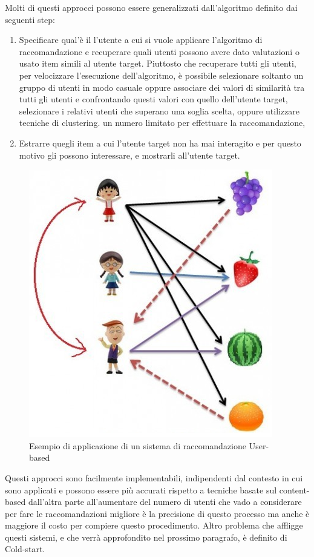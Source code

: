 Molti di questi approcci possono essere generalizzati dall'algoritmo definito dai seguenti step:
\begin{enumerate}
	\item Specificare qual'è il l'utente a cui si vuole applicare l'algoritmo di raccomandazione e recuperare quali utenti possono 
	avere dato valutazioni o usato item simili al utente target. Piuttosto che recuperare tutti gli utenti, per velocizzare l'esecuzione
	dell'algoritmo, è possibile selezionare soltanto un gruppo di utenti in modo casuale oppure associare dei valori di similarità tra 
	tutti gli utenti e confrontando questi valori con quello dell'utente target, selezionare i relativi utenti che superano una soglia
	scelta, oppure utilizzare tecniche di clustering. 
	un numero limitato per effettuare la raccomandazione, 
	\item Estrarre quegli item a cui l'utente target non ha mai interagito e per questo motivo gli possono interessare, e mostrarli 
	all'utente target.
\end{enumerate}

\begin{figure}[ht!]
	\centering
	\includegraphics[scale=0.5]{images/UB_CF_ex.PNG}
	\caption{Esempio di applicazione di un sistema di raccomandazione User-based}
	\label{fig:UB_CF}
\end{figure}

Questi approcci sono facilmente implementabili, indipendenti dal contesto in cui sono applicati e possono essere più accurati rispetto
a tecniche basate sul content-based dall'altra parte all'aumentare del numero di utenti che vado a considerare per fare le 
raccomandazioni migliore è la precisione di questo processo ma anche è maggiore il costo per compiere questo procedimento. Altro 
problema che affligge questi sistemi, e che verrà approfondito nel prossimo paragrafo, è definito di Cold-start. 

